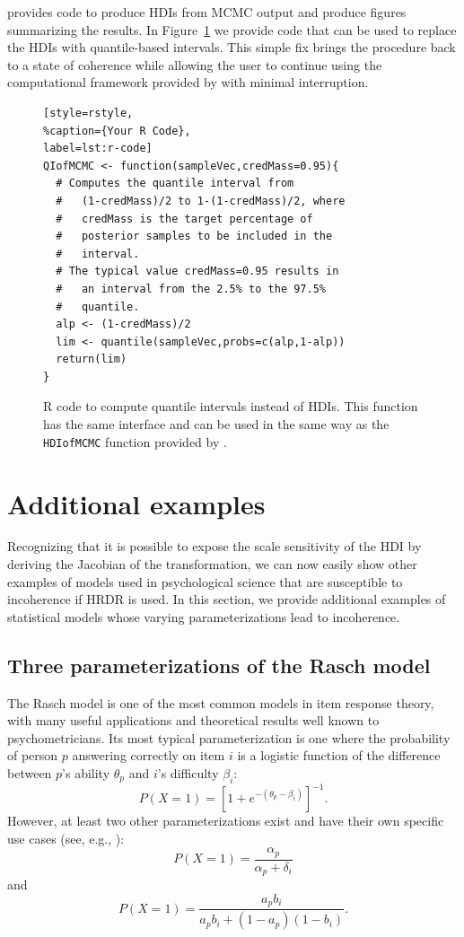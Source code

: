 \documentclass[9pt,twocolumn,twoside]{cidlab-draft}\templatetype{cidlab-invited}
\newcommand{\hdr}{HRDR}
\begin{document}
 provides code to produce HDIs from MCMC output and produce figures summarizing the results. In Figure~\ref{fig:rcode} we provide code that can be used to replace the HDIs with quantile-based intervals. This simple fix brings the procedure back to a state of coherence while allowing the user to continue using the computational framework provided by  with minimal interruption.

\begin{figure}
    \centering
\begin{lstlisting}[style=rstyle, 
%caption={Your R Code}, 
label=lst:r-code]
QIofMCMC <- function(sampleVec,credMass=0.95){
  # Computes the quantile interval from
  #   (1-credMass)/2 to 1-(1-credMass)/2, where
  #   credMass is the target percentage of 
  #   posterior samples to be included in the
  #   interval.
  # The typical value credMass=0.95 results in
  #   an interval from the 2.5% to the 97.5%
  #   quantile.
  alp <- (1-credMass)/2
  lim <- quantile(sampleVec,probs=c(alp,1-alp))
  return(lim)
}\end{lstlisting}
\caption{R code to compute quantile intervals instead of HDIs.  This function has the same interface and can be used in the same way as the \texttt{HDIofMCMC} function provided by \protect{}.}
    \label{fig:rcode}
\end{figure}

\section*{Additional examples}

Recognizing that it is possible to expose the scale sensitivity of the HDI by deriving the Jacobian of the transformation, we can now easily show other examples of models used in psychological science that are susceptible to incoherence if \hdr{} is used.  In this section, we provide  additional examples of statistical models whose varying parameterizations lead to incoherence.

\subsection*{Three parameterizations of the Rasch model}

The Rasch model \cite{Rasch1960} is one of the most common models in item response theory, with many useful applications and theoretical results well known to psychometricians.  Its most typical parameterization is one where the probability of person $p$ answering correctly on item $i$ is a logistic function of the difference between $p$'s ability $\theta_p$ and $i$'s difficulty $\beta_i$: $$P(X = 1) = \left[1+e^{-(\theta_p-\beta_i)}\right]^{-1}.$$ However, at least two other parameterizations exist and have their own specific use cases (see, e.g., ): $$P(X = 1) = \frac{\alpha_p}{\alpha_p + \delta_i}$$ and $$P(X = 1) = \frac{a_p b_i}{a_pb_i+(1-a_p)(1-b_i)}.$$
\end{document}
